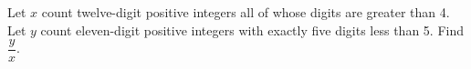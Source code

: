 Let $x$ count twelve-digit positive integers all of whose digits are greater than 4. Let $y$ count eleven-digit positive integers with exactly five digits less than 5. Find $\dfrac{y}{x}$.
